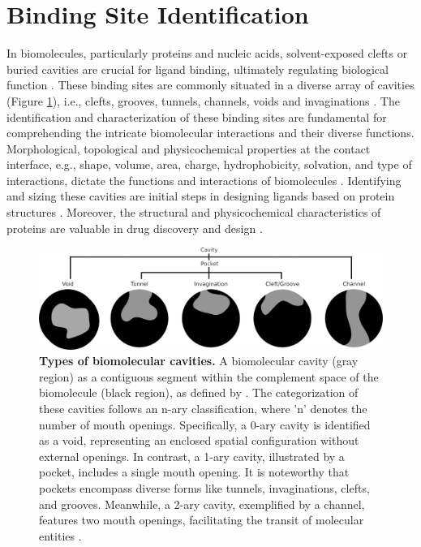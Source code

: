 \documentclass[Ingles]{phdthesis}
\def\ie{i.e.\onedot}
\def\eg{e.g.\onedot}
\begin{document}
\section{Binding Site Identification \label{sec:cavity-detection}}

In biomolecules, particularly proteins and nucleic acids, solvent-exposed clefts or buried cavities are crucial for ligand binding, ultimately regulating biological function \cite{liang1998,sotriffer2002,henrich2010}. These binding sites are commonly situated in a diverse array of cavities (Figure \ref{fig:cavity-classification}), \ie, clefts, grooves, tunnels, channels, voids and invaginations \cite{simoes2017,guerra2019}. The identification and characterization of these binding sites are fundamental for comprehending the intricate biomolecular interactions and their diverse functions. Morphological, topological and physicochemical properties at the contact interface, \eg, shape, volume, area, charge, hydrophobicity, solvation, and type of interactions, dictate the functions and interactions of biomolecules \cite{hubbard1994,bohacek1997,sotriffer2002,henrich2010,guerra2019}. Identifying and sizing these cavities are initial steps in designing ligands based on protein structures \cite{liang1998}. Moreover, the structural and physicochemical characteristics of proteins are valuable in drug discovery and design \cite{guerra2019}.

\begin{figure}[H]
  \centerline{\includegraphics[scale=1]{images/cavity-classification.png}}
  \caption[Types of biomolecular cavities]{\textbf{Types of biomolecular cavities.} A biomolecular cavity (gray region) as a contiguous segment within the complement space of the biomolecule (black region), as defined by \cite{lay2013}. The categorization of these cavities follows an n-ary classification, where 'n' denotes the number of mouth openings. Specifically, a 0-ary cavity is identified as a void, representing an enclosed spatial configuration without external openings. In contrast, a 1-ary cavity, illustrated by a pocket, includes a single mouth opening. It is noteworthy that pockets encompass diverse forms like tunnels, invaginations, clefts, and grooves. Meanwhile, a 2-ary cavity, exemplified by a channel, features two mouth openings, facilitating the transit of molecular entities \cite{simoes2017}.}
  \label{fig:cavity-classification}
\end{figure}
\end{document}
